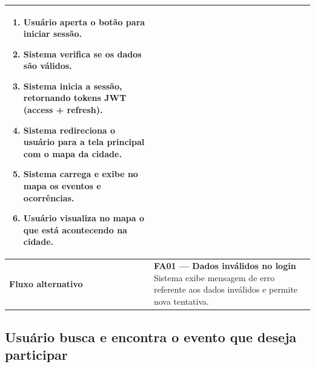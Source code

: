 \begin{longtable}{|p{4cm}|p{10cm}|}
\begin{enumerate}
      \item Usuário aperta o botão para iniciar sessão.
      \item Sistema verifica se os dados são válidos.
      \item Sistema inicia a sessão, retornando tokens JWT (access + refresh).
      \item Sistema redireciona o usuário para a tela principal com o mapa da cidade.
      \item Sistema carrega e exibe no mapa os eventos e ocorrências.
      \item Usuário visualiza no mapa o que está acontecendo na cidade.
    \end{enumerate} \\
  \hline
  \textbf{Fluxo alternativo} & \textbf{FA01 — Dados inválidos no login} \newline
    Sistema exibe mensagem de erro referente aos dados inválidos e permite nova tentativa. \\
  \hline
\end{longtable}

\subsection{Usuário busca e encontra o evento que deseja participar}

